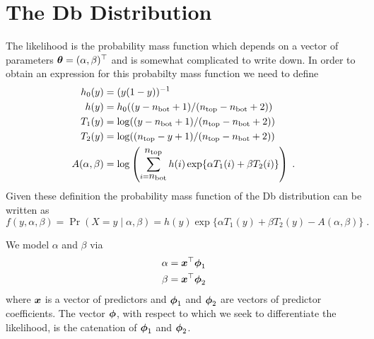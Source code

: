 \section{The Db Distribution}
The likelihood is the probability mass function which depends on
a vector of parameters $\mbox{$\boldsymbol{\theta}$} = (\alpha,\beta)^{\top}$ and is
somewhat complicated to write down.
In order to obtain an expression for this probabilty mass function
we need to define
\begin{align*}
h_0(y) &= (y(1-y))^{-1} \\
h(y)   &= h_0((y - \mbox{$n_{\textup{\textrm{bot}}}$} + 1)/(\mbox{$n_{\textup{\textrm{top}}}$} - \mbox{$n_{\textup{\textrm{bot}}}$} + 2)) \\
T_1(y) &= \log((y - \mbox{$n_{\textup{\textrm{bot}}}$} + 1)/(\mbox{$n_{\textup{\textrm{top}}}$} - \mbox{$n_{\textup{\textrm{bot}}}$} + 2)) \\
T_2(y) &= \log((\mbox{$n_{\textup{\textrm{top}}}$} - y + 1)/(\mbox{$n_{\textup{\textrm{top}}}$} - \mbox{$n_{\textup{\textrm{bot}}}$} + 2)) \\
A(\alpha,\beta) &= \log \left( \sum_{i=\mbox{$n_{\textup{\textrm{bot}}}$}}^{\mbox{$n_{\textup{\textrm{top}}}$}} h(i)
                       \exp\{\alpha T_1(i) + \beta T_2(i) \} \right) \; .
\end{align*}
Given these definition the probability mass function of the Db
distribution can be written as
\[
f(y,\alpha,\beta) = \Pr(X=y \mid \alpha, \beta)
                  = h(y) \exp\{\alpha T_1(y) + \beta T_2(y)
                                   - A(\alpha,\beta)\} \; .
\]

We model $\alpha$ and $\beta$ via
\begin{align*}
\alpha &= \mbox{$\boldsymbol{x}$}^{\top} \mbox{$\boldsymbol{\phi}$}_1 \\
\beta  &= \mbox{$\boldsymbol{x}$}^{\top} \mbox{$\boldsymbol{\phi}$}_2
\end{align*}
where $\mbox{$\boldsymbol{x}$}$ is a vector of predictors and $\mbox{$\boldsymbol{\phi}$}_1$ and $\mbox{$\boldsymbol{\phi}$}_2$
are vectors of predictor coefficients.  The vector $\mbox{$\boldsymbol{\phi}$}$, with
respect to which we seek to differentiate the likelihood, is the
catenation of $\mbox{$\boldsymbol{\phi}$}_1$ and $\mbox{$\boldsymbol{\phi}$}_2$.

